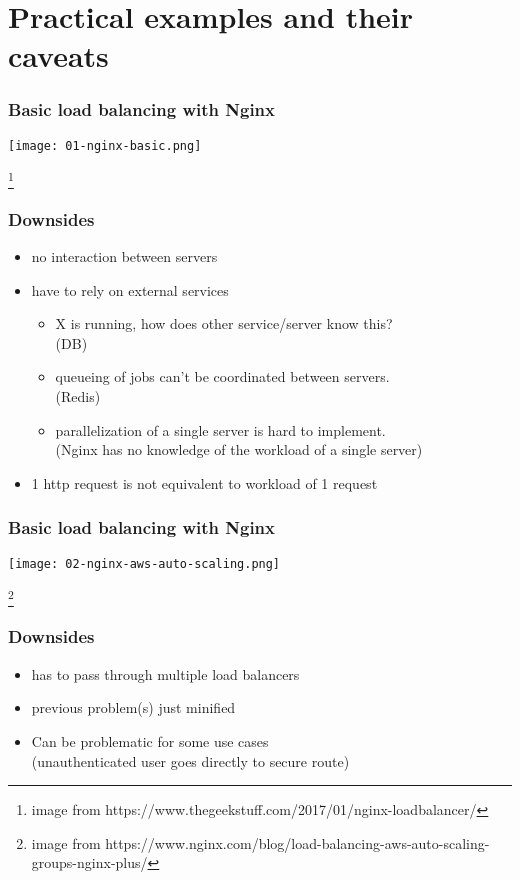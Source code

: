 \section{Practical examples and their caveats}
\frame{\tableofcontents[currentsection]}

\begin{frame}
    \frametitle{Basic load balancing with Nginx}
    \begin{center}
        \texttt{[image: 01-nginx-basic.png]}
    \end{center}
    \footnote{image from https://www.thegeekstuff.com/2017/01/nginx-loadbalancer/}
\end{frame}

\begin{frame}
    \frametitle{Downsides}
    \begin{itemize}
        \item no interaction between servers
        \item have to rely on external services
        \begin{itemize}
            \item X is running, how does other service/server know this? \\ 
            (DB) 
            \item queueing of jobs can't be coordinated between servers. \\ 
            (Redis)
            \item parallelization of a single server is hard to implement. \\ 
            (Nginx has no knowledge of the workload of a single server)
        \end{itemize}
    \item 1 http request is not equivalent to workload of 1 request
    \end{itemize}
\end{frame}



\begin{frame}
    \frametitle{Basic load balancing with Nginx}
    \begin{center}
        \texttt{[image: 02-nginx-aws-auto-scaling.png]}
    \end{center}
    \footnote{image from https://www.nginx.com/blog/load-balancing-aws-auto-scaling-groups-nginx-plus/}
\end{frame}

\begin{frame}
    \frametitle{Downsides}
    \begin{itemize}
        \item has to pass through multiple load balancers
        \item previous problem(s) just minified
        \item Can be problematic for some use cases \\ 
        (unauthenticated user goes directly to secure route)
    \end{itemize}
\end{frame}



